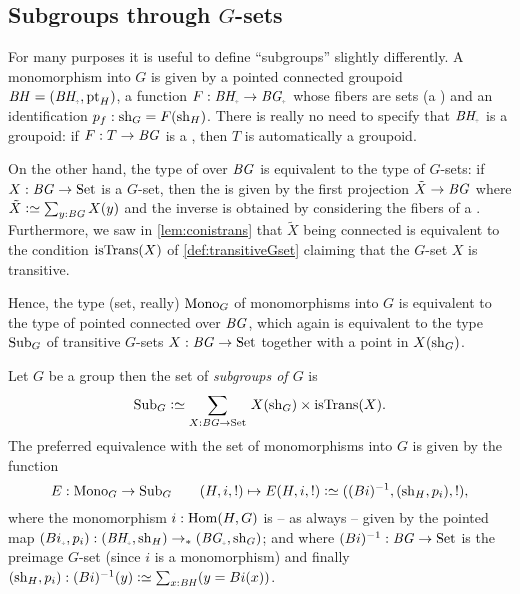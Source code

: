 \subsection{Subgroups through $G$-sets}

For many purposes it is useful to define ``subgroups'' slightly differently.
A monomorphism into $G$ is given by a pointed connected groupoid  $\BH=(\BH_\div,\pt_H)$, a function $F:\BH_\div\to\BG_\div$ whose fibers are sets (a \covering) and an identification $p_f:\mathrm{sh}_G=F(\mathrm{sh}_H)$.  There is really no need to specify that $\BH_\div$ is a groupoid: if $F:T\to \mathit{B}\mathit{G}$ is a \covering, then $T$ is automatically a groupoid.

On the other hand,  the type of \coverings over $\mathit{B}\mathit{G}$ is equivalent to the type of $G$-sets: if $X:\mathit{B}\mathit{G}\to\mathrm{Set}$ is a $G$-set, then the \covering is given by the first projection $\tilde X\to \mathit{B}\mathit{G}$ where $\tilde X\defequi\sum_{y:\BG}X(y)$ and the inverse is obtained by considering the fibers of a \covering.  Furthermore, we saw in \cref{lem:conistrans} that $\tilde X$ being connected is equivalent to the condition $\istrans(X)$ of \cref{def:transitiveGset} claiming that the $G$-set $X$ is transitive.

Hence, the type (set, really) $\mathrm{Mono}_G$ of monomorphisms into $G$ is equivalent to the type of pointed connected \coverings over $\mathit{B}\mathit{G}$, which again is equivalent to the type $\mathrm{Sub}_G$ of transitive $G$-sets $X:\mathit{B}\mathit{G}\to\mathrm{Set}$ together with a point in $X(\mathrm{sh}_G)$.

\begin{definition}
  Let $G$ be a group then the set of \emph{subgroups of $G$} is
  $$\typesubgroup_G\defequi\sum_{X:\BG\to\Set}{\,}X(\sh_G)\times\mathrm{isTrans}(X).$$
  The preferred equivalence
  with the set of monomorphisms into $G$ is given by the function
  $$E:\typemono_G\to\typesubgroup_G\qquad (H,i,!)\mapsto E(H,i,!)\defequi ((Bi)^{-1},(\sh_H,p_i),!),$$
  where the monomorphism $i:\Hom(H,G)$ is -- as always -- given by the pointed map $(Bi_\div,p_i):(\BH_\div,\sh_H)\to_*(\BG_\div,\sh_G)$; and where $(Bi)^{-1}:\mathit{B}\mathit{G}\to\mathrm{Set}$ is the preimage $G$-set (since $i$ is a monomorphism)  and finally $(\sh_H,p_i):(Bi)^{-1}(y)\defequi \sum_{x:\BH}(y=Bi(x))$.
\end{definition}

